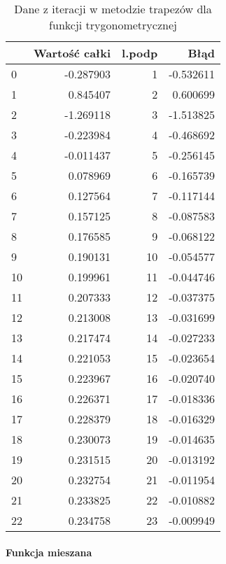 \documentclass[12pt,twoside]{article}
\begin{document}
\begin{table}[H]
\centering 
\caption{Dane z iteracji w metodzie trapezów dla funkcji trygonometrycznej}
\label{tabela2.2}
\begin{tabular}{lrrr}
\toprule
{} &  Wartość całki &  l.podp &      Błąd \\
\midrule
0  &      -0.287903 &       1 & -0.532611 \\
1  &       0.845407 &       2 &  0.600699 \\
2  &      -1.269118 &       3 & -1.513825 \\
3  &      -0.223984 &       4 & -0.468692 \\
4  &      -0.011437 &       5 & -0.256145 \\
5  &       0.078969 &       6 & -0.165739 \\
6  &       0.127564 &       7 & -0.117144 \\
7  &       0.157125 &       8 & -0.087583 \\
8  &       0.176585 &       9 & -0.068122 \\
9  &       0.190131 &      10 & -0.054577 \\
10 &       0.199961 &      11 & -0.044746 \\
11 &       0.207333 &      12 & -0.037375 \\
12 &       0.213008 &      13 & -0.031699 \\
13 &       0.217474 &      14 & -0.027233 \\
14 &       0.221053 &      15 & -0.023654 \\
15 &       0.223967 &      16 & -0.020740 \\
16 &       0.226371 &      17 & -0.018336 \\
17 &       0.228379 &      18 & -0.016329 \\
18 &       0.230073 &      19 & -0.014635 \\
19 &       0.231515 &      20 & -0.013192 \\
20 &       0.232754 &      21 & -0.011954 \\
21 &       0.233825 &      22 & -0.010882 \\
22 &       0.234758 &      23 & -0.009949 \\
\bottomrule
\end{tabular}
\end{table}

\paragraph{Funkcja mieszana}\mbox{} \\
\end{document}
